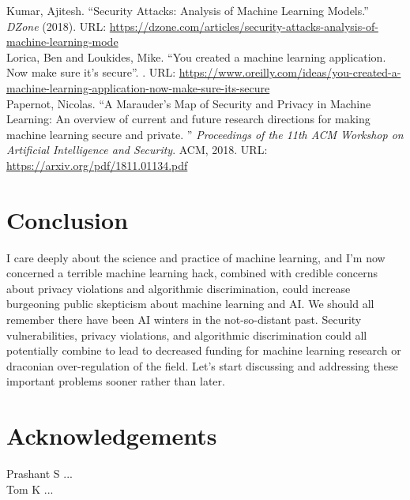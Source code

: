 \documentclass[fleqn]{article}
\begin{document}
\noindent Kumar, Ajitesh. ``Security Attacks: Analysis of Machine Learning Models.'' \textit{DZone} (2018). URL: \url{https://dzone.com/articles/security-attacks-analysis-of-machine-learning-mode}\\

\noindent Lorica, Ben and Loukides, Mike. ``You created a machine learning application. Now make sure it’s secure''. . URL: \url{https://www.oreilly.com/ideas/you-created-a-machine-learning-application-now-make-sure-its-secure}\\

\noindent Papernot, Nicolas. ``A Marauder's Map of Security and Privacy in Machine Learning: An overview of current and future research directions for making machine learning secure and private. '' \textit{Proceedings of the 11th ACM Workshop on Artificial Intelligence and Security}. ACM, 2018. URL: \url{https://arxiv.org/pdf/1811.01134.pdf}

\section{Conclusion}

I care deeply about the science and practice of machine learning, and I'm now concerned a terrible machine learning hack, combined with credible concerns about privacy violations and algorithmic discrimination, could increase burgeoning public skepticism about machine learning and AI. We should all remember there have been AI winters in the not-so-distant past. Security vulnerabilities, privacy violations, and algorithmic discrimination could all potentially combine to lead to decreased funding for machine learning research or draconian over-regulation of the field. Let's start discussing and addressing these important problems sooner rather than later.

\section{Acknowledgements}

\noindent Prashant S ... \\
\noindent Tom K ... 
\end{document}
